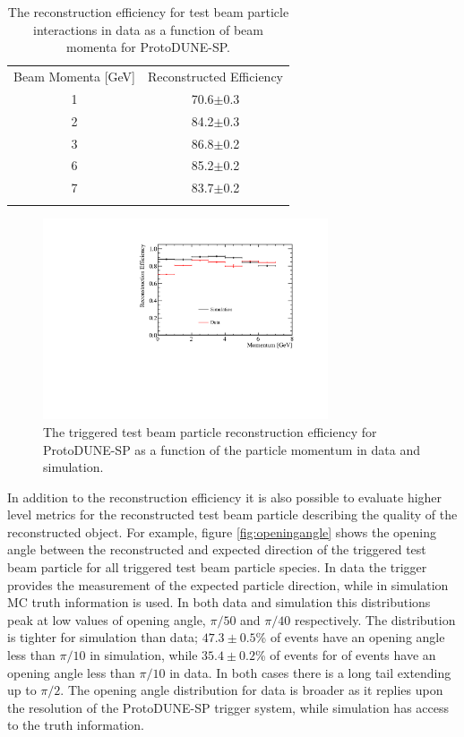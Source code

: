 \begin{table}
\centering
\caption{The reconstruction efficiency for test beam particle interactions in data as a function of beam momenta for ProtoDUNE-SP.}
\label{tab:dataeff} 
\begin{tabular}{cc}
\hline\noalign{\smallskip}
Beam Momenta [GeV] & Reconstructed Efficiency  \\
\noalign{\smallskip}\hline\noalign{\smallskip}
1 & 70.6$\pm$0.3 \\
2 & 84.2$\pm$0.3 \\
3 & 86.8$\pm$0.2 \\
6 & 85.2$\pm$0.2 \\
7 & 83.7$\pm$0.2 \\
\noalign{\smallskip}\hline
\end{tabular}
\end{table}

\begin{figure}
\centering
\includegraphics[width=0.75\textwidth]{Figures/Metrics/Data/Beam/BeamParticleEfficiencyVsMomentum.pdf}
\caption{The triggered test beam particle reconstruction efficiency for ProtoDUNE-SP as a function of the particle momentum in data and simulation.}
\label{fig:datamcrecoeff}
\end{figure}

In addition to the reconstruction efficiency it is also possible to evaluate higher level metrics for the reconstructed test beam particle describing the quality of the reconstructed object.  For example, figure \ref{fig:openingangle} shows the opening angle between the reconstructed and expected direction of the triggered test beam particle for all triggered test beam particle species.  In data the trigger provides the measurement of the expected particle direction, while in simulation MC truth information is used.  In both data and simulation this distributions peak at low values of opening angle, $\pi/50$ and $\pi/40$ respectively.  The distribution is tighter for simulation than data; $47.3\pm0.5$\% of events have an opening angle less than $\pi/10$ in simulation, while $35.4\pm0.2$\% of events for of events have an opening angle less than $\pi/10$ in data.  In both cases there is a long tail extending up to $\pi/2$.  The opening angle distribution for data is broader as it replies upon the resolution of the ProtoDUNE-SP trigger system, while simulation has access to the truth information.  

